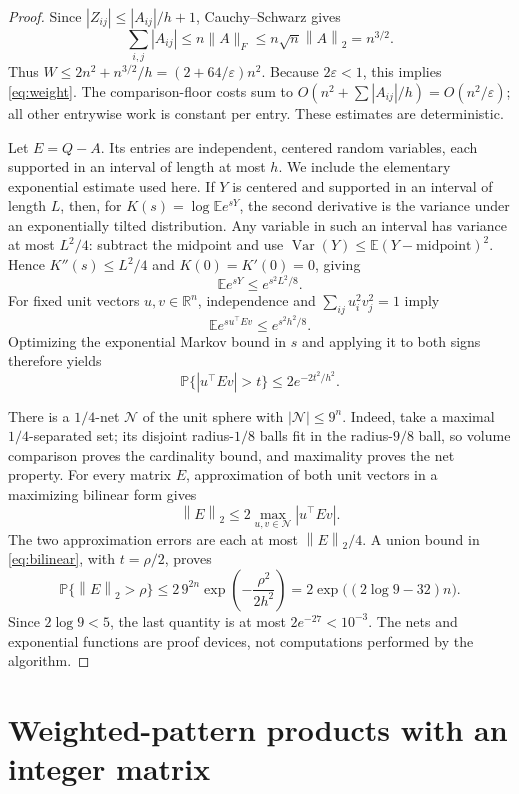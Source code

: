\documentclass[11pt,a4paper]{article}
\theoremstyle{remark}
\newcommand{\R}{\mathbb R}
\newcommand{\E}{\mathbb E}
\newcommand{\PP}{\mathbb P}
\newcommand{\eps}{\varepsilon}
\newcommand{\norm}[1]{\left\|#1\right\|_2}
\begin{document}
\begin{proof}
Since $|Z_{ij}|\le |A_{ij}|/h+1$, Cauchy--Schwarz gives
\[
 \sum_{i,j}|A_{ij}|\le n\|A\|_F\le n\sqrt n\norm{A}=n^{3/2}.
\]
Thus $W\le2n^2+n^{3/2}/h=(2+64/\eps)n^2$. Because $2\eps<1$,
this implies \eqref{eq:weight}. The comparison-floor costs sum to
$O(n^2+\sum|A_{ij}|/h)=O(n^2/\eps)$; all other entrywise work is constant
per entry. These estimates are deterministic.

Let $E=Q-A$. Its entries are independent, centered random variables, each
supported in an interval of length at most $h$. We include the elementary
exponential estimate used here. If $Y$ is centered and supported in an interval
of length $L$, then, for $K(s)=\log\E e^{sY}$, the second derivative is the
variance under an exponentially tilted distribution. Any variable in such an
interval has variance at most $L^2/4$: subtract the midpoint and use
$\operatorname{Var}(Y)\le\E(Y-\mathrm{midpoint})^2$. Hence
$K''(s)\le L^2/4$ and $K(0)=K'(0)=0$, giving
\[
 \E e^{sY}\le e^{s^2L^2/8}.
\]
For fixed unit vectors $u,v\in\R^n$, independence and
$\sum_{ij}u_i^2v_j^2=1$ imply
\[
 \E e^{s u^\top Ev}\le e^{s^2h^2/8}.
\]
Optimizing the exponential Markov bound in $s$ and applying it to both signs
therefore yields
\begin{equation}\label{eq:bilinear}
 \PP\{|u^\top Ev|>t\}\le2e^{-2t^2/h^2}.
\end{equation}

There is a $1/4$-net $\mathcal N$ of the unit sphere with
$|\mathcal N|\le9^n$. Indeed, take a maximal $1/4$-separated set; its disjoint
radius-$1/8$ balls fit in the radius-$9/8$ ball, so volume comparison proves
the cardinality bound, and maximality proves the net property. For every
matrix $E$, approximation of both unit vectors in a maximizing bilinear form
gives
\[
 \norm{E}\le2\max_{u,v\in\mathcal N}|u^\top Ev|.
\]
The two approximation errors are each at most $\norm{E}/4$.
A union bound in \eqref{eq:bilinear}, with $t=\rho/2$, proves
\[
 \PP\{\norm{E}>\rho\}
 \le2\,9^{2n}\exp\!\left(-\frac{\rho^2}{2h^2}\right)
 =2\exp\bigl((2\log9-32)n\bigr).
\]
Since $2\log9<5$, the last quantity is at most $2e^{-27}<10^{-3}$.
The nets and exponential functions are proof devices, not computations
performed by the algorithm.
\end{proof}

\section{Weighted-pattern products with an integer matrix}
\end{document}
